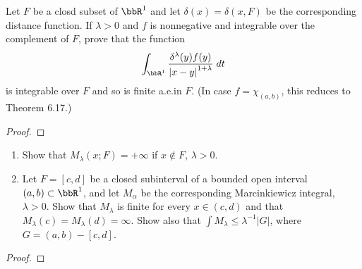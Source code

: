 \begin{problem}
Let $F$ be a closd subset of $\bbR^1$ and let $\delta(x)=\delta(x,F)$ be
the corresponding distance function. If $\lambda>0$ and $f$ is nonnegative
and integrable over the complement of $F$, prove that the function
\[
\int_{\bbR^1}\frac{\delta^\lambda(y)f(y)}{\left|x-y\right|^{1+\lambda}}\;dt
\]
is integrable over $F$ and so is finite a.e.\@ in $F$. (In case
$f=\chi_{(a,b)}$, this reduces to Theorem 6.17.)
\end{problem}
\begin{proof}
\end{proof}
\newpage

\begin{problem}
\begin{enumerate}[label=(\alph*)]
\item Show that $M_\lambda(x;F)=+\infty$ if $x\notin F$, $\lambda>0$.
\item Let $F=[c,d]$ be a closed subinterval of a bounded open interval
  $(a,b)\subset\bbR^1$, and let $M_\alpha$ be the corresponding
  Marcinkiewicz integral, $\lambda>0$. Show that $M_\lambda$ is finite for
  every $x\in(c,d)$ and that $M_\lambda(c)=M_\lambda(d)=\infty$. Show also
  that $\int M_\lambda\leq\lambda^{-1}|G|$, where $G=(a,b)-[c,d]$.
\end{enumerate}
\end{problem}
\begin{proof}
\end{proof}

